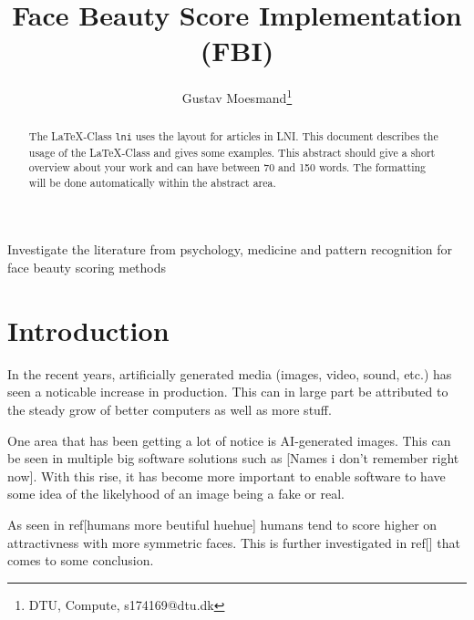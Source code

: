 \documentclass[english]{lni}
\author{Gustav Moesmand\footnote{DTU, Compute, s174169@dtu.dk}}
\title{Face Beauty Score Implementation (FBI)}
\renewcommand{\headrulewidth}{0.4pt} %
\begin{document}
\maketitle
\cite[test]{j_iyer_machine_2021}

\renewcommand{\refname}{References}
\setcounter{footnote}{2} %
\thispagestyle{titlepage}
\pagestyle{fancy}
\fancyhead{} %
\fancyfoot{} %
\renewcommand{\headrulewidth}{0.4pt} %

\begin{abstract}
	The \LaTeX-Class \texttt{lni} uses the layout for articles in LNI. This document describes the usage of the \LaTeX-Class and gives some examples. This abstract should give a short overview about your work and can have between 70 and 150 words. The formatting will be done automatically within the abstract area.
\end{abstract}
\begin{keywords}
\end{keywords}

Investigate the literature from psychology, medicine and pattern recognition
for face beauty scoring methods

\section{Introduction}
In the recent years, artificially generated media (images, video, sound, etc.) has seen a noticable increase in production. This can in large part be attributed to the steady grow of better computers as well as more stuff.

One area that has been getting a lot of notice is AI-generated images. This can be seen in multiple big software solutions such as [Names i don't remember right now]. With this rise, it has become more important to enable software to have some idea of the likelyhood of an image being a fake or real.

As seen in ref[humans more beutiful huehue] humans tend to score higher on attractivness with more symmetric faces. This is further investigated in ref[] that comes to some conclusion.
\end{document}
